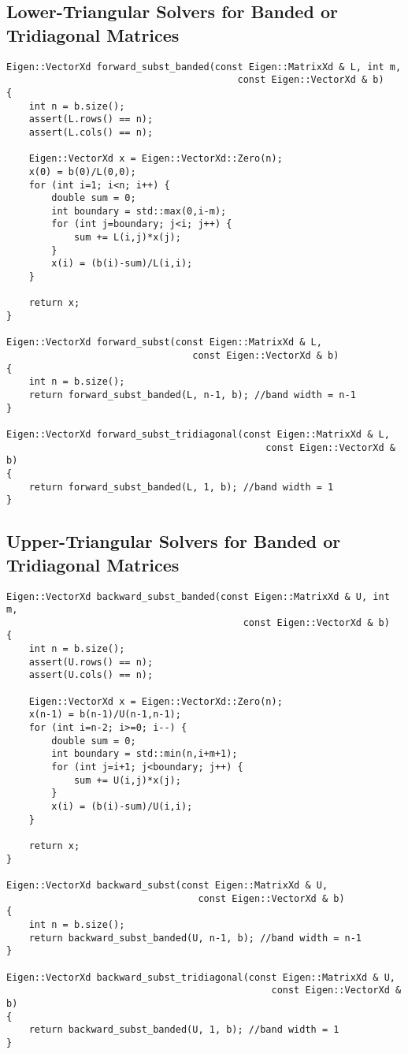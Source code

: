 \documentclass[paper=a4, fontsize=11pt]{scrartcl} %
\numberwithin{equation}{section} %
\numberwithin{figure}{section} %
\numberwithin{table}{section} %
\begin{document}
\subsection{Lower-Triangular Solvers for Banded or Tridiagonal Matrices}
\begin{lstlisting}
Eigen::VectorXd forward_subst_banded(const Eigen::MatrixXd & L, int m,
                                         const Eigen::VectorXd & b)
{
    int n = b.size();
    assert(L.rows() == n);
    assert(L.cols() == n);

    Eigen::VectorXd x = Eigen::VectorXd::Zero(n);
    x(0) = b(0)/L(0,0);
    for (int i=1; i<n; i++) {
        double sum = 0;
        int boundary = std::max(0,i-m);
        for (int j=boundary; j<i; j++) {
            sum += L(i,j)*x(j);
        }
        x(i) = (b(i)-sum)/L(i,i);
    }
    
    return x;
}

Eigen::VectorXd forward_subst(const Eigen::MatrixXd & L, 
                                 const Eigen::VectorXd & b)
{
    int n = b.size();
    return forward_subst_banded(L, n-1, b); //band width = n-1
}

Eigen::VectorXd forward_subst_tridiagonal(const Eigen::MatrixXd & L, 
                                              const Eigen::VectorXd & b)
{
    return forward_subst_banded(L, 1, b); //band width = 1
}
\end{lstlisting}
\newpage
\subsection{Upper-Triangular Solvers for Banded or Tridiagonal Matrices}
\begin{lstlisting}
Eigen::VectorXd backward_subst_banded(const Eigen::MatrixXd & U, int m,
                                          const Eigen::VectorXd & b)
{
    int n = b.size();
    assert(U.rows() == n);
    assert(U.cols() == n);

    Eigen::VectorXd x = Eigen::VectorXd::Zero(n);
    x(n-1) = b(n-1)/U(n-1,n-1);
    for (int i=n-2; i>=0; i--) {
        double sum = 0;
        int boundary = std::min(n,i+m+1);
        for (int j=i+1; j<boundary; j++) {
            sum += U(i,j)*x(j);
        }
        x(i) = (b(i)-sum)/U(i,i);
    }

    return x;
}

Eigen::VectorXd backward_subst(const Eigen::MatrixXd & U, 
                                  const Eigen::VectorXd & b)
{
    int n = b.size();
    return backward_subst_banded(U, n-1, b); //band width = n-1
}

Eigen::VectorXd backward_subst_tridiagonal(const Eigen::MatrixXd & U, 
                                               const Eigen::VectorXd & b)
{
    return backward_subst_banded(U, 1, b); //band width = 1
}
\end{lstlisting}
\end{document}
